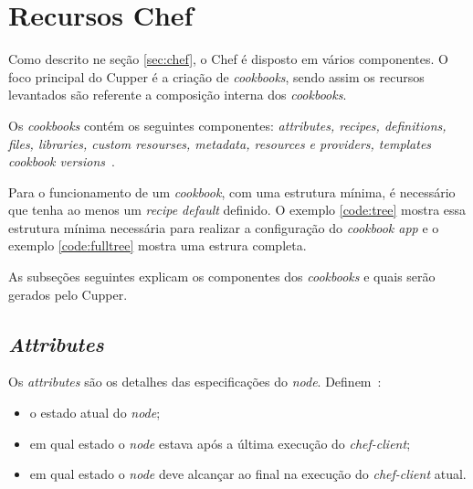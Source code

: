 \section{Recursos Chef}
\label{sec:lev-rec}

Como descrito ne seção \ref{sec:chef}, o Chef é disposto em vários
componentes. O foco principal do Cupper é a criação de \textit{cookbooks},
sendo assim os recursos levantados são referente a composição interna
dos \textit{cookbooks}.

Os \textit{cookbooks} contém os seguintes componentes: \textit{attributes, recipes, definitions,
files, libraries, custom resourses, metadata, resources e providers, templates
cookbook versions}~\cite{chefdoc:2016}.

Para o funcionamento de um \textit{cookbook}, com uma estrutura mínima, é necessário que tenha
ao menos um \textit{recipe default} definido. O exemplo \ref{code:tree} mostra essa
estrutura mínima necessária para realizar a configuração do \textit{cookbook app} e o exemplo
\ref{code:fulltree} mostra uma estrura completa.

\noindent\begin{minipage}{.45\textwidth}
  
\end{minipage}\hfill
\noindent\begin{minipage}{.45\textwidth}
  
\end{minipage}

As subseções seguintes explicam os componentes dos \textit{cookbooks} e quais serão gerados
pelo Cupper.

\subsection{\textit{Attributes}}
\label{sec:lev-rec-att}

Os \textit{attributes} são os detalhes das especificações do \textit{node}. Definem~\cite{chefdoc:2016}:

\begin{itemize}
  \item o estado atual do \textit{node};
  \item em qual estado o \textit{node} estava após a última execução do \textit{chef-client};
  \item em qual estado o \textit{node} deve alcançar ao final na execução do \textit{chef-client} atual.
\end{itemize}

